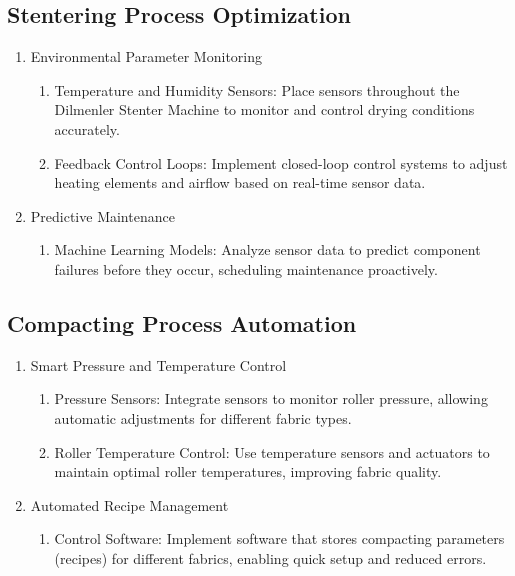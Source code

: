 \subsection{Stentering Process Optimization}
\begin{enumerate}
    \item Environmental Parameter Monitoring
    \begin{enumerate}
        \item Temperature and Humidity Sensors: Place sensors throughout the Dilmenler Stenter Machine to monitor and control drying conditions accurately.
        \item Feedback Control Loops: Implement closed-loop control systems to adjust heating elements and airflow based on real-time sensor data.
    \end{enumerate}
    \item Predictive Maintenance
    \begin{enumerate}
        \item Machine Learning Models: Analyze sensor data to predict component failures before they occur, scheduling maintenance proactively.
    \end{enumerate}
\end{enumerate}

\subsection{Compacting Process Automation}
\begin{enumerate}
    \item Smart Pressure and Temperature Control
    \begin{enumerate}
        \item Pressure Sensors: Integrate sensors to monitor roller pressure, allowing automatic adjustments for different fabric types.
        \item Roller Temperature Control: Use temperature sensors and actuators to maintain optimal roller temperatures, improving fabric quality.
    \end{enumerate}
    \item Automated Recipe Management
    \begin{enumerate}
        \item Control Software: Implement software that stores compacting parameters (recipes) for different fabrics, enabling quick setup and reduced errors.
    \end{enumerate}
\end{enumerate}

